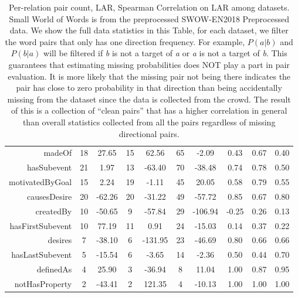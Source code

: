 \documentclass[letterpaper]{article} %
\begin{document}
\begin{table}[ht]
\begin{tabular}{@{}r|cc|cc|cc|ccc@{}}
madeOf            & 	18        & 	27.65    &	15      & 	62.56   & 	65        & 	-2.09      & 	0.43 & 	0.67 & 	0.40 \\
hasSubevent       & 	21        & 	1.97     &	13      & 	-63.40  & 	70        & 	-38.48     & 	0.74 & 	0.78 & 	0.50 \\
motivatedByGoal   & 	15        & 	2.24     &	19      & 	-1.11   & 	45        & 	20.05      & 	0.58 & 	0.79 & 	0.55 \\
causesDesire      & 	20        & 	-62.26   &	20      & 	-31.22  & 	49        & 	-57.72     & 	0.85 & 	0.67 & 	0.80 \\
createdBy         & 	10        & 	-50.65   &	9       & 	-57.84  & 	29        & 	-106.94    & 	-0.25 & 	0.26 & 	0.13 \\
hasFirstSubevent  & 	10        & 	77.19    &	11      & 	0.91    & 	24        & 	-15.03     & 	0.14 & 	0.37 & 	0.22 \\
desires           & 	7         & 	-38.10   &	6       & 	-131.95 & 	23        & 	-46.69     & 	0.80 & 	0.66 & 	0.66 \\
hasLastSubevent   & 	5         & 	-15.54   &	6       & 	-3.65   & 	14        & 	-2.36      & 	0.50 & 	0.44 & 	0.70 \\
definedAs         & 	4         & 	25.90    &	3       & 	-36.94  & 	8         & 	11.04      & 	1.00 & 	0.87 & 	0.95 \\
notHasProperty    & 	2         & 	-43.41   &	2       & 	121.35  & 	4         & 	-10.13     & 	1.00 & 	1.00 & 	1.00 \\

\end{tabular}

\caption{Per-relation pair count, LAR, Spearman Correlation on LAR among datasets. Small World of Words is from the preprocessed SWOW-EN2018 Preprocessed data. We show the full data statistics in this Table, for each dataset, we filter the word pairs that only has one direction frequency. For example, $P(a|b)$ and $P(b|a)$ will be filtered if \textit{b} is not a target of \textit{a} or \textit{a} is not a target of \textit{b}. 
This guarantees that estimating missing probabilities does NOT play a part in pair evaluation. It is more likely that the missing pair not being there indicates the pair has close to zero probability in that direction than being accidentally missing from the dataset since the data is collected from the crowd. 
The result of this is a collection of ``clean pairs'' that has a higher correlation in general than overall statistics collected from all the pairs regardless of missing directional pairs. %
}

\label{tab:full_data_lar_cam}
\end{table}
\end{document}
